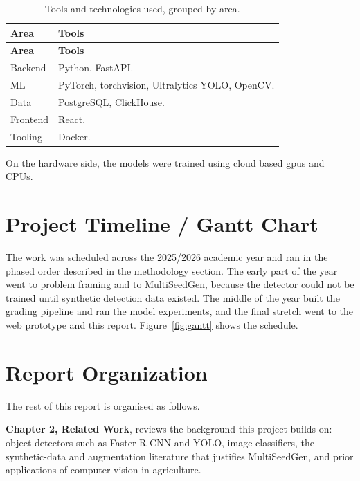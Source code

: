 \begin{singlespace}
\begin{longtable}{p{} p{}}
  \caption{Tools and technologies used, grouped by area.}
  \label{tab:ch1-tools} \\
  \toprule
  \textbf{Area} & \textbf{Tools} \\
  \midrule
  \endfirsthead
  \toprule
  \textbf{Area} & \textbf{Tools} \\
  \midrule
  \endhead
  \bottomrule
  \endfoot
  Backend &
    Python, FastAPI. \\
  ML &
    PyTorch, torchvision, Ultralytics YOLO, OpenCV. \\
  Data &
    PostgreSQL, ClickHouse. \\
  Frontend &
    React. \\
  Tooling &
    Docker. \\
\end{longtable}
\end{singlespace}

On the hardware side, the models were trained using cloud based gpus and CPUs.

\section{Project Timeline / Gantt Chart}

The work was scheduled across the 2025/2026 academic year and ran in the phased
order described in the methodology section. The early part of the year went to
problem framing and to MultiSeedGen, because the detector could not be trained until
synthetic detection data existed. The middle of the year built the grading pipeline
and ran the model experiments, and the final stretch went to the web prototype and
this report. Figure~\ref{fig:gantt} shows the schedule.


\section{Report Organization}

The rest of this report is organised as follows.

\textbf{Chapter 2, Related Work}, reviews the background this project builds on:
object detectors such as Faster R-CNN and YOLO, image classifiers,
the synthetic-data and augmentation literature that justifies MultiSeedGen,
and prior applications of computer vision in agriculture.

